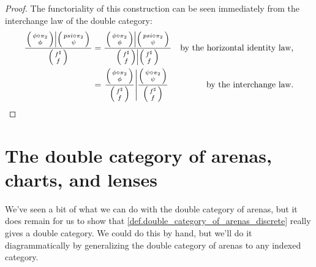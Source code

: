 \documentclass[DynamicalBook]{subfiles}
\begin{document}
\begin{proof}
  The functoriality of this construction can be seen immediately from the
  interchange law of the double category:
  \begin{align*}
  \frac{\left.\littlelens{\phi \circ \pi_2}{\phi} \middle| \littlelens{psi
    \circ \pi_2}{\psi} \right. }{\littlelens{f^{\sharp}}{f}} &= \frac{\left.\littlelens{\phi \circ \pi_2}{\phi} \middle| \littlelens{psi
    \circ \pi_2}{\psi} \right. }{\left. \littlelens{f^{\sharp}}{f} \middle| \littlelens{f^{\sharp}}{f} \right.} &\mbox{by the horizontal identity law,}\\
    &= \left.
      \frac{\littlelens{\phi \circ \pi_2}{\phi}}{\littlelens{f^{\sharp}}{f}}
      \middle|\frac{\littlelens{\psi \circ
          \pi_2}{\psi}}{\littlelens{f^{\sharp}}{f}} \right. &\mbox{by the interchange law.}
  \end{align*}
\end{proof}



\section{The double category of arenas, charts, and lenses}

We've seen a bit of what we can do with the double category of arenas, but it does remain for us to show that \cref{def.double_category_of_arenas_discrete}
really gives a double category. We could do this by hand, but we'll do it
diagrammatically by generalizing the double category of arenas to any indexed
category.
\end{document}

